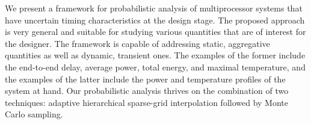 We present a framework for probabilistic analysis of multiprocessor systems that
have uncertain timing characteristics at the design stage. The proposed approach
is very general and suitable for studying various quantities that are of
interest for the designer. The framework is capable of addressing static,
aggregative quantities as well as dynamic, transient ones. The examples of the
former include the end-to-end delay, average power, total energy, and maximal
temperature, and the examples of the latter include the power and temperature
profiles of the system at hand. Our probabilistic analysis thrives on the
combination of two techniques: adaptive hierarchical sparse-grid interpolation
followed by Monte Carlo sampling.
